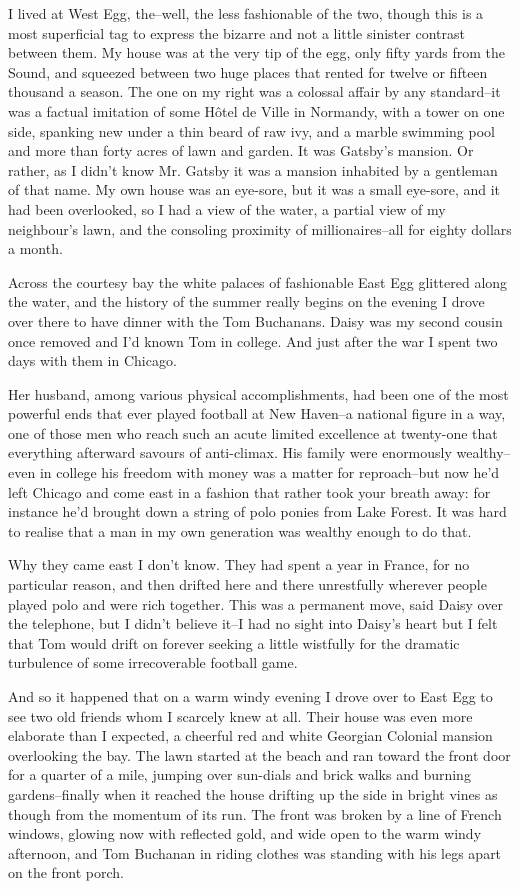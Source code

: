 \documentclass[a4paper,12pt]{article}
\begin{document}
I lived at West Egg, the--well, the less fashionable of the two, though
this is a most superficial tag to express the bizarre and not a little
sinister contrast between them. My house was at the very tip of the
egg, only fifty yards from the Sound, and squeezed between two huge
places that rented for twelve or fifteen thousand a season. The one on
my right was a colossal affair by any standard--it was a factual
imitation of some Hôtel de Ville in Normandy, with a tower on one side,
spanking new under a thin beard of raw ivy, and a marble swimming pool
and more than forty acres of lawn and garden. It was Gatsby's mansion.
Or rather, as I didn't know Mr. Gatsby it was a mansion inhabited by
a gentleman of that name. My own house was an eye-sore, but it was a
small eye-sore, and it had been overlooked, so I had a view of the
water, a partial view of my neighbour's lawn, and the consoling
proximity of millionaires--all for eighty dollars a month.

Across the courtesy bay the white palaces of fashionable East Egg
glittered along the water, and the history of the summer really begins
on the evening I drove over there to have dinner with the Tom
Buchanans. Daisy was my second cousin once removed and I'd known Tom
in college. And just after the war I spent two days with them in
Chicago.

Her husband, among various physical accomplishments, had been one of
the most powerful ends that ever played football at New Haven--a
national figure in a way, one of those men who reach such an acute
limited excellence at twenty-one that everything afterward savours of
anti-climax. His family were enormously wealthy--even in college his
freedom with money was a matter for reproach--but now he'd left Chicago
and come east in a fashion that rather took your breath away: for
instance he'd brought down a string of polo ponies from Lake Forest.
It was hard to realise that a man in my own generation was wealthy
enough to do that.

Why they came east I don't know. They had spent a year in France, for no
particular reason, and then drifted here and there unrestfully wherever
people played polo and were rich together. This was a permanent move,
said Daisy over the telephone, but I didn't believe it--I had no sight
into Daisy's heart but I felt that Tom would drift on forever seeking
a little wistfully for the dramatic turbulence of some irrecoverable
football game.

And so it happened that on a warm windy evening I drove over to East
Egg to see two old friends whom I scarcely knew at all. Their house was
even more elaborate than I expected, a cheerful red and white Georgian
Colonial mansion overlooking the bay. The lawn started at the beach
and ran toward the front door for a quarter of a mile, jumping over
sun-dials and brick walks and burning gardens--finally when it reached
the house drifting up the side in bright vines as though from the
momentum of its run. The front was broken by a line of French windows,
glowing now with reflected gold, and wide open to the warm windy
afternoon, and Tom Buchanan in riding clothes was standing with his
legs apart on the front porch.
\end{document}
